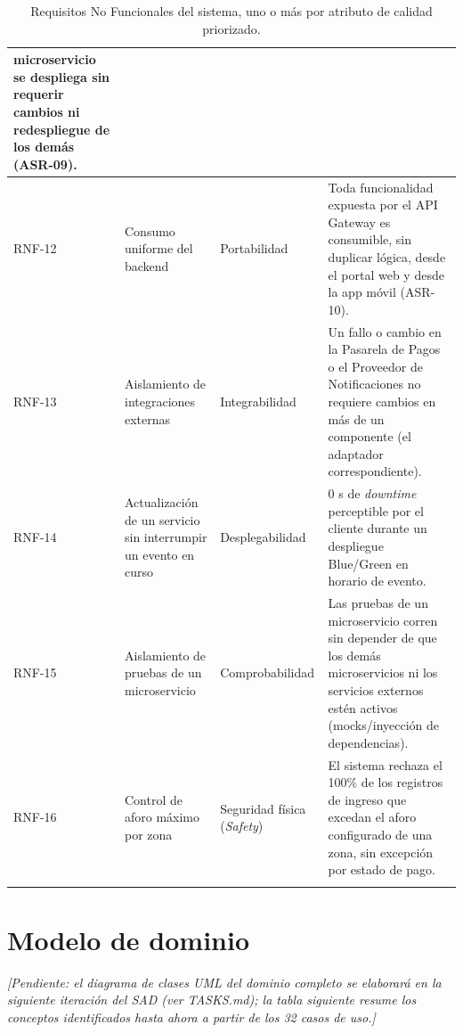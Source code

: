 \documentclass[11pt,a4paper]{article}
\newcommand{\pendiente}[1]{\textit{\textcolor{grisoscuro}{[Pendiente: #1]}}}
\begin{document}
\begin{center}
\begin{longtable}{|p{1.3cm}|p{4.6cm}|p{2.4cm}|p{5.3cm}|}
microservicio se despliega sin requerir cambios ni redespliegue de los demás (ASR-09).\\
\hline
RNF-12 & Consumo uniforme del backend & Portabilidad & Toda funcionalidad expuesta por el API
Gateway es consumible, sin duplicar lógica, desde el portal web y desde la app móvil (ASR-10).\\
\hline
RNF-13 & Aislamiento de integraciones externas & Integrabilidad & Un fallo o cambio en la
Pasarela de Pagos o el Proveedor de Notificaciones no requiere cambios en más de un componente
(el adaptador correspondiente).\\
\hline
RNF-14 & Actualización de un servicio sin interrumpir un evento en curso & Desplegabilidad &
0 s de \textit{downtime} perceptible por el cliente durante un despliegue Blue/Green en horario
de evento.\\
\hline
RNF-15 & Aislamiento de pruebas de un microservicio & Comprobabilidad & Las pruebas de un
microservicio corren sin depender de que los demás microservicios ni los servicios externos
estén activos (mocks/inyección de dependencias).\\
\hline
RNF-16 & Control de aforo máximo por zona & Seguridad física (\textit{Safety}) & El sistema
rechaza el 100\% de los registros de ingreso que excedan el aforo configurado de una zona, sin
excepción por estado de pago.\\
\hline
\caption{Requisitos No Funcionales del sistema, uno o más por atributo de calidad priorizado.}
\label{tab:rnf}
\end{longtable}
\end{center}

\section{Modelo de dominio}
\label{sec:dominio}

\pendiente{el diagrama de clases UML del dominio completo se elaborará en la siguiente iteración
del SAD (ver \textit{TASKS.md}); la tabla siguiente resume los conceptos identificados hasta ahora
a partir de los 32 casos de uso.}
\end{document}
